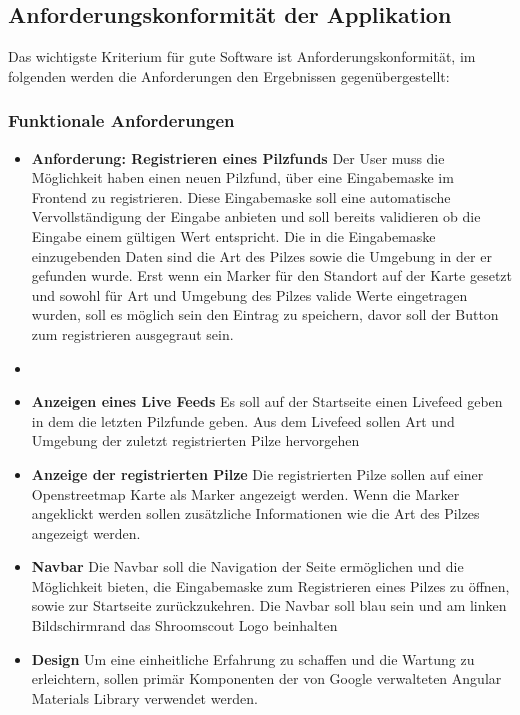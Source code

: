\documentclass[../main.tex]{subfiles}
\begin{document}
\subsection{Anforderungskonformität der Applikation}
Das wichtigste Kriterium für gute Software ist Anforderungskonformität, im folgenden werden die Anforderungen den Ergebnissen gegenübergestellt:

\subsubsection{Funktionale Anforderungen}

\begin{itemize}

	\item \textbf{Anforderung: Registrieren eines Pilzfunds}
	      Der User muss die Möglichkeit haben einen neuen Pilzfund, über eine Eingabemaske im Frontend zu registrieren.
		  Diese Eingabemaske soll eine automatische Vervollständigung der Eingabe anbieten und soll bereits validieren ob die Eingabe einem gültigen
		  Wert entspricht. Die in die Eingabemaske einzugebenden Daten sind die Art des Pilzes sowie die Umgebung in der er gefunden wurde.
		  Erst wenn ein Marker für den Standort auf der Karte gesetzt und sowohl für Art und Umgebung des Pilzes valide Werte eingetragen wurden, soll es 
		  möglich sein den Eintrag zu speichern, davor soll der Button zum registrieren ausgegraut sein.
    \item \textbf{}
	\item \textbf{Anzeigen eines Live Feeds}
	      Es soll auf der Startseite einen Livefeed geben in dem die letzten Pilzfunde geben. 
		  Aus dem Livefeed sollen Art und Umgebung der zuletzt registrierten Pilze hervorgehen

	\item \textbf{Anzeige der registrierten Pilze}
		  Die registrierten Pilze sollen auf einer Openstreetmap Karte als Marker angezeigt werden.
		  Wenn die Marker angeklickt werden sollen zusätzliche Informationen wie die Art des Pilzes angezeigt werden.
	      

	\item \textbf{Navbar}
	      Die Navbar soll die Navigation der Seite ermöglichen und die Möglichkeit bieten, die Eingabemaske zum Registrieren eines Pilzes zu öffnen, sowie zur Startseite zurückzukehren.
		  Die Navbar soll blau sein und am linken Bildschirmrand das Shroomscout Logo beinhalten

	\item \textbf{Design}
	      Um eine einheitliche Erfahrung zu schaffen und die Wartung zu erleichtern, sollen primär Komponenten der von Google verwalteten Angular Materials Library verwendet werden.

\end{itemize}
\end{document}

